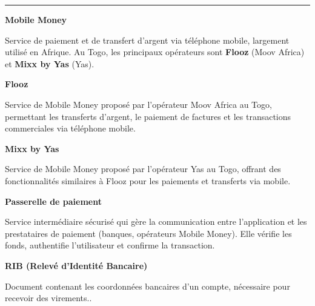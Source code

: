 \documentclass[12pt,a4paper]{report}
\begin{document}
\vspace{0.2cm}
{\textcolor{grismoyen}{\rule{\textwidth}{0.4pt}}}

\vspace{0.6cm}

\begin{infobox}
\textbf{Mobile Money}

Service de paiement et de transfert d'argent via téléphone mobile, largement utilisé en Afrique. Au Togo, les principaux opérateurs sont \textbf{Flooz} (Moov Africa) et \textbf{Mixx by Yas} (Yas).
\end{infobox}

\vspace{0.6cm}

\begin{infobox}
\textbf{Flooz}

Service de Mobile Money proposé par l'opérateur Moov Africa au Togo, permettant les transferts d'argent, le paiement de factures et les transactions commerciales via téléphone mobile.
\end{infobox}

\vspace{0.6cm}

\begin{infobox}
\textbf{Mixx by Yas}

Service de Mobile Money proposé par l'opérateur Yas au Togo, offrant des fonctionnalités similaires à Flooz pour les paiements et transferts via mobile.
\end{infobox}

\vspace{0.6cm}

\begin{infobox}
\textbf{Passerelle de paiement}

Service intermédiaire sécurisé qui gère la communication entre l'application et les prestataires de paiement (banques, opérateurs Mobile Money). Elle vérifie les fonds, authentifie l'utilisateur et confirme la transaction.
\end{infobox}

\vspace{0.6cm}

\begin{infobox}
\textbf{RIB (Relevé d'Identité Bancaire)}

Document contenant les coordonnées bancaires d'un compte, nécessaire pour recevoir des virements..
\end{infobox}

\vspace{0.6cm}
\end{document}
